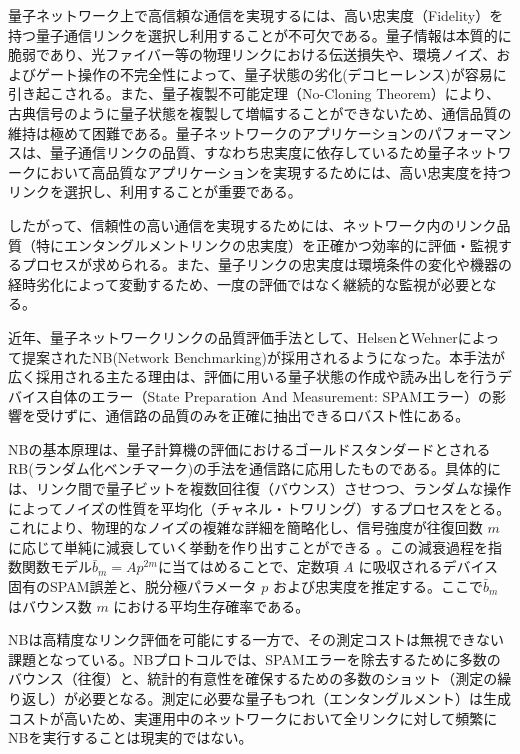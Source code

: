 \documentclass[12pt,a4paper,titlepage,dvipdfmx]{article}
\begin{document}
量子ネットワーク上で高信頼な通信を実現するには、高い忠実度（Fidelity）を持つ量子通信リンクを選択し利用することが不可欠である。量子情報は本質的に脆弱であり、光ファイバー等の物理リンクにおける伝送損失や、環境ノイズ、およびゲート操作の不完全性によって、量子状態の劣化(デコヒーレンス)が容易に引き起こされる\cite{nielsen2010quantum}。また、量子複製不可能定理（No-Cloning Theorem）により、古典信号のように量子状態を複製して増幅することができないため、通信品質の維持は極めて困難である\cite{wootters1982single}。量子ネットワークのアプリケーションのパフォーマンスは、量子通信リンクの品質、すなわち忠実度に依存しているため量子ネットワークにおいて高品質なアプリケーションを実現するためには、高い忠実度を持つリンクを選択し、利用することが重要である。

したがって、信頼性の高い通信を実現するためには、ネットワーク内のリンク品質（特にエンタングルメントリンクの忠実度）を正確かつ効率的に評価・監視するプロセスが求められる。また、量子リンクの忠実度は環境条件の変化や機器の経時劣化によって変動するため、一度の評価ではなく継続的な監視が必要となる。

近年、量子ネットワークリンクの品質評価手法として、HelsenとWehnerによって提案されたNB(Network Benchmarking)が採用されるようになった\cite{helsen2023benchmarking}。本手法が広く採用される主たる理由は、評価に用いる量子状態の作成や読み出しを行うデバイス自体のエラー（State Preparation And Measurement: SPAMエラー）の影響を受けずに、通信路の品質のみを正確に抽出できるロバスト性にある。

NBの基本原理は、量子計算機の評価におけるゴールドスタンダードとされるRB(ランダム化ベンチマーク)の手法を通信路に応用したものである\cite{magesan2012characterizing, emerson2005scalable}。具体的には、リンク間で量子ビットを複数回往復（バウンス）させつつ、ランダムな操作によってノイズの性質を平均化（チャネル・トワリング）するプロセスをとる。これにより、物理的なノイズの複雑な詳細を簡略化し、信号強度が往復回数 $m$ に応じて単純に減衰していく挙動を作り出すことができる 。この減衰過程を指数関数モデル$\bar{b}_m = A p^{2m}$に当てはめることで、定数項 $A$ に吸収されるデバイス固有のSPAM誤差と、脱分極パラメータ $p$ および忠実度を推定する。ここで$\bar{b}_m$はバウンス数 $m$ における平均生存確率である。

NBは高精度なリンク評価を可能にする一方で、その測定コストは無視できない課題となっている。NBプロトコルでは、SPAMエラーを除去するために多数のバウンス（往復）と、統計的有意性を確保するための多数のショット（測定の繰り返し）が必要となる。測定に必要な量子もつれ（エンタングルメント）は生成コストが高いため、実運用中のネットワークにおいて全リンクに対して頻繁にNBを実行することは現実的ではない。
\end{document}
